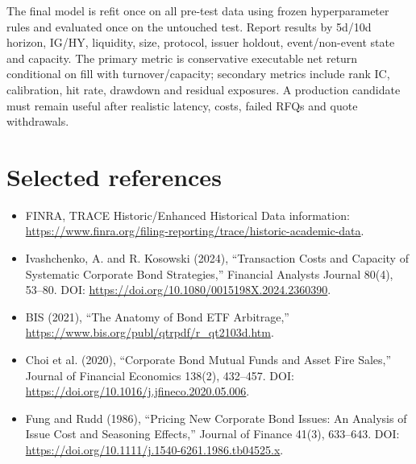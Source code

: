 \documentclass[10pt]{article}
\begin{document}
The final model is refit once on all pre-test data using frozen hyperparameter rules and evaluated once on the untouched test. Report results by 5d/10d horizon, IG/HY, liquidity, size, protocol, issuer holdout, event/non-event state and capacity. The primary metric is conservative executable net return conditional on fill with turnover/capacity; secondary metrics include rank IC, calibration, hit rate, drawdown and residual exposures. A production candidate must remain useful after realistic latency, costs, failed RFQs and quote withdrawals.

\section{Selected references}
\begin{itemize}
\item FINRA, TRACE Historic/Enhanced Historical Data information: \url{https://www.finra.org/filing-reporting/trace/historic-academic-data}.
\item Ivashchenko, A. and R. Kosowski (2024), ``Transaction Costs and Capacity of Systematic Corporate Bond Strategies,'' Financial Analysts Journal 80(4), 53--80. DOI: \url{https://doi.org/10.1080/0015198X.2024.2360390}.
\item BIS (2021), ``The Anatomy of Bond ETF Arbitrage,'' \url{https://www.bis.org/publ/qtrpdf/r_qt2103d.htm}.
\item Choi et al. (2020), ``Corporate Bond Mutual Funds and Asset Fire Sales,'' Journal of Financial Economics 138(2), 432--457. DOI: \url{https://doi.org/10.1016/j.jfineco.2020.05.006}.
\item Fung and Rudd (1986), ``Pricing New Corporate Bond Issues: An Analysis of Issue Cost and Seasoning Effects,'' Journal of Finance 41(3), 633--643. DOI: \url{https://doi.org/10.1111/j.1540-6261.1986.tb04525.x}.
\end{itemize}
\end{document}
